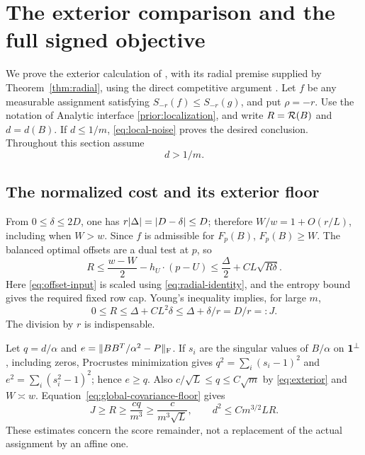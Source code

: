 \section{The exterior comparison and the full signed objective}
\label{sec:assembly}
We prove the exterior calculation of \cite{assembly}, with its radial
premise supplied by Theorem~\ref{thm:radial}, using the direct competitive
argument \cite{direct}. Let $f$ be any measurable assignment satisfying
$S_{-r}(f)\le S_{-r}(g)$, and put $\rho=-r$. Use the notation of Analytic interface
\ref{prior:localization}, and write $R=\mathcal R(B)$ and $d=d(B)$.
If $d\le1/m$, \eqref{eq:local-noise} proves the desired conclusion.
Throughout this section assume
\begin{equation}\label{eq:exterior}
                              d>1/m.
\end{equation}

\subsection{The normalized cost and its exterior floor}
From $0\le\delta\le2D$, one has
$r\lvert \Delta\rvert=\lvert D-\delta\rvert\le D$; therefore
$W/w=1+O(r/L)$, including when $W>w$.
Since $f$ is admissible for $F_p(B)$, $F_p(B)\ge W$.
The balanced optimal offsets are a dual test at $p$, so
\[
 R\le\frac{w-W}{2}-h_U\cdot(p-U)
       \le\frac\Delta2+CL\sqrt{R\delta}.
\]
Here \eqref{eq:offset-input} is scaled using
\eqref{eq:radial-identity}, and the entropy bound gives the required
fixed row cap. Young's inequality implies, for large $m$,
\begin{equation}\label{eq:Rpaid}
              0\le R\le\Delta+CL^2\delta
                   \le\Delta+\delta/r=D/r=:J.
\end{equation}
The division by $r$ is indispensable.

Let $q=d/\alpha$ and $e=\lVert BB^T/\alpha^2-P\rVert_{\mathrm F}$.
If $s_i$ are the singular values of $B/\alpha$ on $\mathbf 1^\perp$,
including zeros, Procrustes minimization gives
$q^2=\sum_i(s_i-1)^2$ and $e^2=\sum_i(s_i^2-1)^2$; hence $e\ge q$.
Also $c/\sqrt L\le q\le C\sqrt m$ by \eqref{eq:exterior} and
$W\asymp w$. Equation~\eqref{eq:global-covariance-floor} gives
\begin{equation}\label{eq:exteriorfloor}
 J\ge R\ge\frac{cq}{m^3}\ge\frac{c}{m^3\sqrt L},
                   \qquad d^2\le C m^{3/2}L R.
\end{equation}
These estimates concern the score remainder, not a replacement of the
actual assignment by an affine one.

